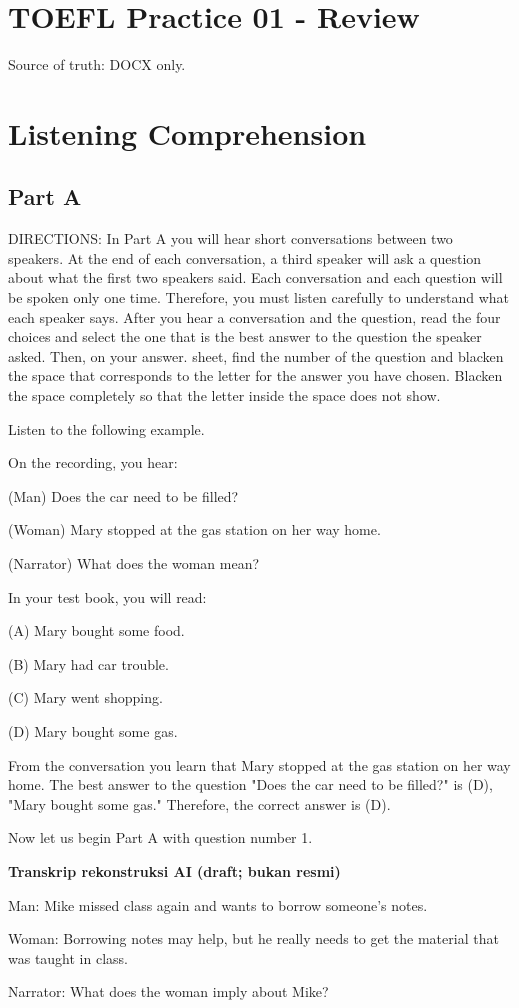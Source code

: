 \documentclass[12pt]{article}
\begin{document}
\section*{TOEFL Practice 01 - Review}
Source of truth: DOCX only.
\section*{Listening Comprehension}
\subsection*{Part A}
DIRECTIONS: In Part A you will hear short conversations between two speakers. At the end of each conversation, a third speaker will ask a question about what the first two speakers said. Each conversation and each question will be spoken only one time. Therefore, you must listen carefully to understand what each speaker says. After you hear a conversation and the question, read the four choices and select the one that is the best answer to the question the speaker asked. Then, on your answer. sheet, find the number of the question and blacken the space that corresponds to the letter for the answer you have chosen. Blacken the space completely so that the letter inside the space does not show.\par
\begin{exampleblock}
Listen to the following example.\par
On the recording, you hear:\par
(Man) Does the car need to be filled?\par
(Woman) Mary stopped at the gas station on her way home.\par
(Narrator) What does the woman mean?\par
In your test book, you will read:\par
(A) Mary bought some food.\par
(B) Mary had car trouble.\par
(C) Mary went shopping.\par
(D) Mary bought some gas.\par
From the conversation you learn that Mary stopped at the gas station on her way home. The best answer to the question "Does the car need to be filled?" is (D), "Mary bought some gas." Therefore, the correct answer is (D).\par
Now let us begin Part A with question number 1.\par
\end{exampleblock}
\begin{exampleblock}
\textbf{Transkrip rekonstruksi AI (draft; bukan resmi)}\par
Man: Mike missed class again and wants to borrow someone's notes.\par
Woman: Borrowing notes may help, but he really needs to get the material that was taught in class.\par
Narrator: What does the woman imply about Mike?\par
\end{exampleblock}
\end{document}

